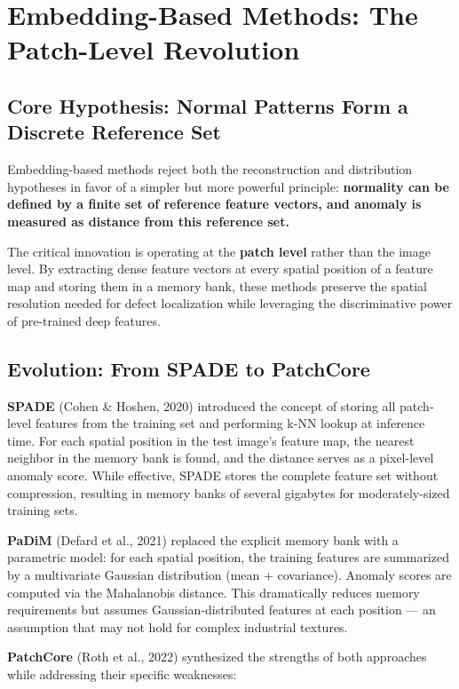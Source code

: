 \documentclass[12pt,a4paper,oneside]{report}
\begin{document}
\section{Embedding-Based Methods: The Patch-Level Revolution}

\subsection{Core Hypothesis: Normal Patterns Form a Discrete Reference Set}

Embedding-based methods reject both the reconstruction and distribution hypotheses in favor of a simpler but more powerful principle: \textbf{normality can be defined by a finite set of reference feature vectors, and anomaly is measured as distance from this reference set.}

The critical innovation is operating at the \textbf{patch level} rather than the image level. By extracting dense feature vectors at every spatial position of a feature map and storing them in a memory bank, these methods preserve the spatial resolution needed for defect localization while leveraging the discriminative power of pre-trained deep features.

\subsection{Evolution: From SPADE to PatchCore}

\textbf{SPADE} (Cohen & Hoshen, 2020) introduced the concept of storing all patch-level features from the training set and performing k-NN lookup at inference time. For each spatial position in the test image's feature map, the nearest neighbor in the memory bank is found, and the distance serves as a pixel-level anomaly score. While effective, SPADE stores the complete feature set without compression, resulting in memory banks of several gigabytes for moderately-sized training sets.

\textbf{PaDiM} (Defard et al., 2021) replaced the explicit memory bank with a parametric model: for each spatial position, the training features are summarized by a multivariate Gaussian distribution (mean + covariance). Anomaly scores are computed via the Mahalanobis distance. This dramatically reduces memory requirements but assumes Gaussian-distributed features at each position --- an assumption that may not hold for complex industrial textures.

\textbf{PatchCore} (Roth et al., 2022) synthesized the strengths of both approaches while addressing their specific weaknesses:
\end{document}
